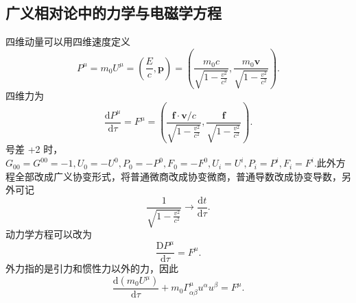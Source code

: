 \documentclass[11pt, a4paper, oneside, onecolumn]{ctexart}
\numberwithin{equation}{subsection}
\begin{document}
\subsection{广义相对论中的力学与电磁学方程}
四维动量可以用四维速度定义
\begin{equation}
P^{\mu}=m_{0}U^{\mu}=\left(\frac{E}{c},\boldsymbol{p}\right)=\left(\frac{m_{0}c}{\sqrt{1-\frac{v^{2}}{c^{2}}}},\frac{m_{0}\boldsymbol{v}}{\sqrt{1-\frac{v^{2}}{c^{2}}}}\right).
\end{equation}
四维力为
\begin{equation}
\frac{\mathrm{d}P^{\mu}}{\mathrm{d}\tau}=F^{\mu}=\left(\frac{\boldsymbol{f}\cdot\boldsymbol{v}/c}{\sqrt{1-\frac{v^{2}}{c^{2}}}},\frac{\boldsymbol{f}}{\sqrt{1-\frac{v^{2}}{c^{2}}}}\right).
\end{equation}
号差 +2 时，$G_{00}=G^{00}=-1,U_{0}=-U^{0},P_{0}=-P^{0},F_{0}=-F^{0},U_{i}=U^{i},P_{i}=P^{i},F_{i}=F^{i}$.此外方程全部改成广义协变形式，将普通微商改成协变微商，普通导数改成协变导数，另外可记
\begin{equation}
\frac{1}{\sqrt{1-\frac{v^{2}}{c^{2}}}}\to\frac{\mathrm{d}t}{\mathrm{d}\tau}.
\end{equation}
动力学方程可以改为
\begin{equation}
\frac{\mathrm{D}P^{\mu}}{\mathrm{d}\tau}=F^{\mu}.
\end{equation}
外力指的是引力和惯性力以外的力，因此
\begin{equation}
\frac{\mathrm{d}\left(m_{0}U^{\mu}\right)}{\mathrm{d}\tau}+m_{0}\Gamma_{\alpha\beta}^{\mu}u^{\alpha}u^{\beta}=F^{\mu}.
\end{equation}
\end{document}
